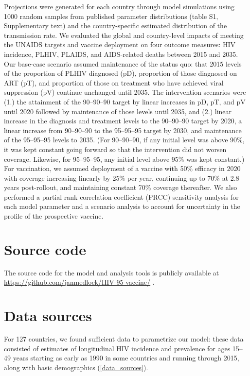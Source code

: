 \documentclass[11pt]{article}
\begin{document}
Projections were generated for each country through model simulations
using 1000 random samples from published parameter distributions
(table S1, Supplementary text) and the country-specific estimated
distribution of the transmission rate. We evaluated the global and
country-level impacts of meeting the UNAIDS targets and vaccine
deployment on four outcome measures: HIV incidence, PLHIV, PLAIDS, and
AIDS-related deaths between 2015 and 2035. Our base-case scenario
assumed maintenance of the status quo: that 2015 levels of the
proportion of PLHIV diagnosed (pD), proportion of those diagnosed on
ART (pT), and proportion of those on treatment who have achieved viral
suppression (pV) continue unchanged until 2035. The intervention
scenarios were (1.) the attainment of the 90–90–90 target by linear
increases in pD, pT, and pV until 2020 followed by maintenance of
those levels until 2035, and (2.) linear increase in the diagnosis and
treatment levels to the 90–90–90 target by 2020, a linear increase
from 90–90–90 to the 95–95–95 target by 2030, and maintenance of the
95–95–95 levels to 2035. (For 90–90–90, if any initial level was above
90\%, it was kept constant going forward so that the intervention did
not worsen coverage.  Likewise, for 95–95–95, any initial level above
95\% was kept constant.)  For vaccination, we assumed deployment of a
vaccine with 50\% efficacy in 2020 with coverage increasing linearly
by 25\% per year, continuing up to 70\% at 2.8 years post-rollout, and
maintaining constant 70\% coverage thereafter.  We also performed a
partial rank correlation coefficient (PRCC) sensitivity analysis for
each model parameter and a scenario analysis to account for
uncertainty in the profile of the prospective vaccine.



\section{Source code}

The source code for the model and analysis tools is publicly available
at \url{https://github.com/janmedlock/HIV-95-vaccine/}
\cite{medlock2016-git}.


\section{Data sources}
\label{data_sources}

For 127 countries, we found sufficient data to parametrize our model:
these data consisted of estimates of longitudinal HIV incidence and
prevalence for ages 15–49 years starting as early as 1990 in some
countries and running through 2015, along with basic demographics
(\autoref{data_sources}).
\end{document}
